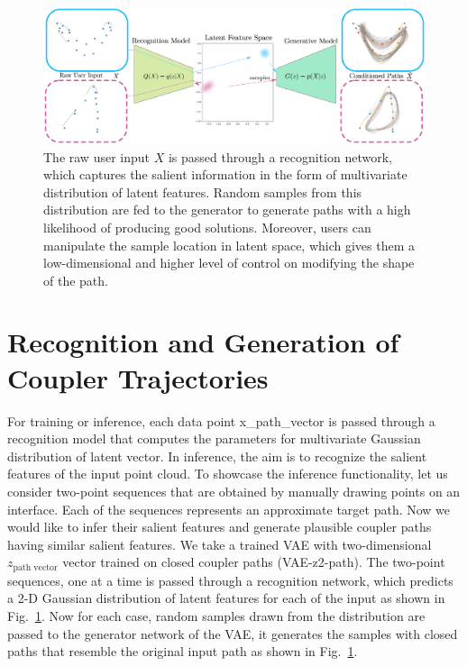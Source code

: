 \begin{figure}
\centering
\includegraphics[width=\textwidth]{jmd-19/figure/fig_recognition_model.eps}
  \caption{The raw user input $X$ is passed through a recognition network, which captures the salient information in the form of multivariate distribution of latent features. Random samples from this distribution are fed to the generator to generate paths with a high likelihood of producing good solutions. Moreover, users can manipulate the sample location in latent space, which gives them a low-dimensional and higher level of control on modifying the shape of the path.}
\label{interactive_recognition}
\end{figure}

\section{Recognition and Generation of Coupler Trajectories}\label{sec_recogn_cp}
For training or inference, each data point \ac{x_path_vector} is passed through a recognition model that computes the parameters for multivariate Gaussian distribution of latent vector.
In inference, the aim is to recognize the salient features of the input point cloud.
To showcase the inference functionality, let us consider two-point sequences that are obtained by manually drawing points on an interface.
Each of the sequences represents an approximate target path.
Now we would like to infer their salient features and generate plausible coupler paths having similar salient features.
We take a trained VAE with two-dimensional $z_{\text{path vector}}$ vector trained on closed coupler paths (VAE-z2-path).
The two-point sequences, one at a time is passed through a recognition network, which predicts a 2-D Gaussian distribution of latent features for each of the input as shown in Fig.~\ref{interactive_recognition}.
Now for each case, random samples drawn from the distribution are passed to the generator network of the VAE, it generates the samples with closed paths that resemble the original input path as shown in Fig.~\ref{interactive_recognition}.

